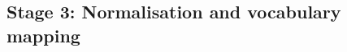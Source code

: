 \documentclass[referee,lineno,pdflatex,sn-vancouver-num]{sn-jnl}
\theoremstyle{thmstyleone}%
\theoremstyle{thmstyletwo}%
\theoremstyle{thmstylethree}%
\begin{document}
\subsection{Stage 3: Normalisation and vocabulary mapping}\label{sec:stage3}
\end{document}
